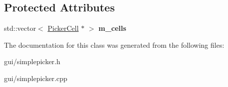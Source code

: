 \subsection*{Protected Attributes}
\begin{DoxyCompactItemize}
\item 
std\+::vector$<$ \hyperlink{classPickerCell}{Picker\+Cell} $\ast$ $>$ {\bfseries m\+\_\+cells}\hypertarget{classSimplePickerCells_ac422d5c90b353038bea733d8e6aefee8}{}\label{classSimplePickerCells_ac422d5c90b353038bea733d8e6aefee8}

\end{DoxyCompactItemize}


The documentation for this class was generated from the following files\+:\begin{DoxyCompactItemize}
\item 
gui/simplepicker.\+h\item 
gui/simplepicker.\+cpp\end{DoxyCompactItemize}

